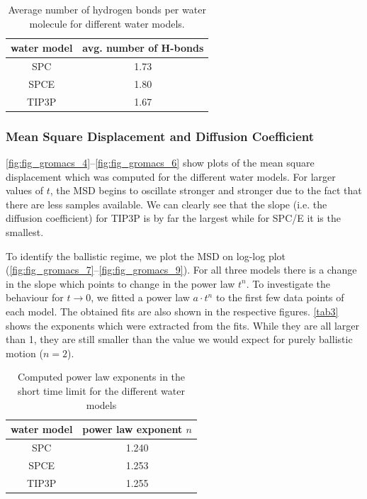 \documentclass[a4paper,10pt,bibtotoc]{scrartcl}
\begin{document}
\begin{table}[h]
\centering
\caption{Average number of hydrogen bonds per water molecule for different water models.}
\begin{tabular}{@{}cc@{}}
\toprule
water model & avg. number of H-bonds \\ \midrule
SPC         &          1.73                 \\
SPCE        &          1.80               \\
TIP3P       &          1.67                 \\ \bottomrule
\end{tabular}
\label{tab1}
\end{table}

\subsubsection*{Mean Square Displacement and Diffusion Coefficient}
\autoref{fig:fig_gromacs_4}--\autoref{fig:fig_gromacs_6} show plots of the mean square displacement which was computed for the different water models. 
For larger values of $t$, the MSD begins to oscillate stronger and stronger due to the fact that there are less samples available. 
We can clearly see that the slope (i.e. the diffusion coefficient) for TIP3P is by far the largest while for SPC/E it is the smallest.

\noindent To identify the ballistic regime, we plot the MSD on log-log plot (\autoref{fig:fig_gromacs_7}--\autoref{fig:fig_gromacs_9}). 
For all three models there is a change in the slope which points to change in the power law $t^n$. 
To investigate the behaviour for $t\rightarrow 0$, we fitted a power law $a\cdot t^n$ to the first few data points of each model.
The obtained fits are also shown in the respective figures.
\autoref{tab3} shows the exponents which were extracted from the fits.
While they are all larger than 1, they are still smaller than the value we would expect for purely ballistic motion ($n=2$).

\begin{table}[h]
\centering
\caption{Computed power law exponents in the short time limit for the different water models}
\begin{tabular}{@{}cc@{}}
\toprule
water model & power law exponent $n$ \\ \midrule
SPC         & 1.240\\
SPCE        & 1.253\\
TIP3P       & 1.255\\ \bottomrule
\end{tabular}
\label{tab3}
\end{table}
\end{document}
